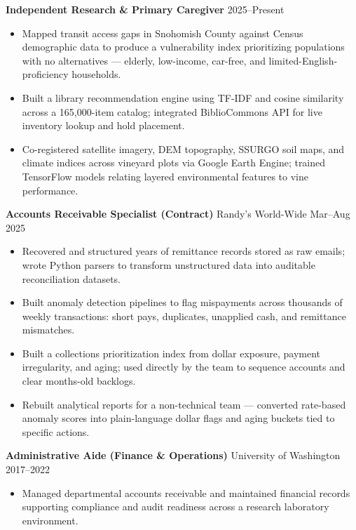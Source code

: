 \documentclass[11pt,a4paper]{article}
\begin{document}
\noindent
\textbf{Independent Research \& Primary Caregiver} \hfill 2025--Present
\begin{itemize}
    \item Mapped transit access gaps in Snohomish County against Census demographic data to produce a vulnerability index prioritizing populations with no alternatives — elderly, low-income, car-free, and limited-English-proficiency households.
    \item Built a library recommendation engine using TF-IDF and cosine similarity across a 165,000-item catalog; integrated BiblioCommons API for live inventory lookup and hold placement.
    \item Co-registered satellite imagery, DEM topography, SSURGO soil maps, and climate indices across vineyard plots via Google Earth Engine; trained TensorFlow models relating layered environmental features to vine performance.
\end{itemize}

\vspace{0.2cm}
\noindent
\textbf{Accounts Receivable Specialist (Contract)} \hfill Randy's World-Wide \hfill Mar--Aug 2025
\begin{itemize}
    \item Recovered and structured years of remittance records stored as raw emails; wrote Python parsers to transform unstructured data into auditable reconciliation datasets.
    \item Built anomaly detection pipelines to flag mispayments across thousands of weekly transactions: short pays, duplicates, unapplied cash, and remittance mismatches.
    \item Built a collections prioritization index from dollar exposure, payment irregularity, and aging; used directly by the team to sequence accounts and clear months-old backlogs.
    \item Rebuilt analytical reports for a non-technical team — converted rate-based anomaly scores into plain-language dollar flags and aging buckets tied to specific actions.
\end{itemize}

\vspace{0.2cm}
\noindent
\textbf{Administrative Aide (Finance \& Operations)} \hfill University of Washington \hfill 2017--2022
\begin{itemize}
    \item Managed departmental accounts receivable and maintained financial records supporting compliance and audit readiness across a research laboratory environment.
\end{itemize}
\end{document}

